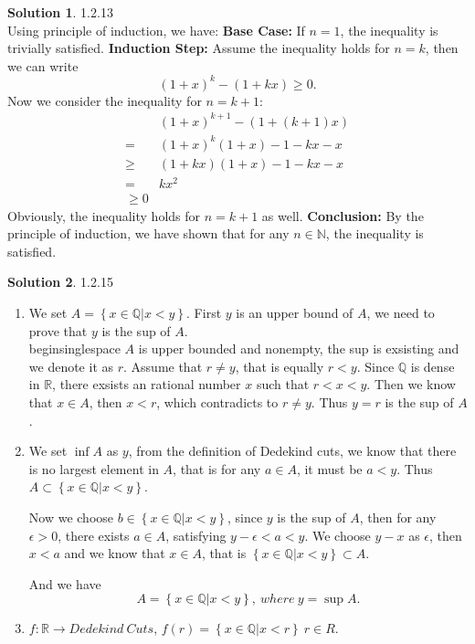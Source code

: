 \documentclass{article}
\theoremstyle{definition}
\newtheorem{sol}{Solution}[exe]
\begin{document}
\begin{sol} 1.2.13\\
Using principle of induction, we have:
\noindent\textbf{Base Case:} If $n=1$, the inequality is trivially satisfied.
\noindent\textbf{Induction Step:} Assume the inequality holds for $n=k$, then we can write
$$(1+x)^{k}-(1+kx)\geq 0.$$
Now we consider the inequality for $n=k+1$:
\begin{align*}
    &(1+x)^{k+1}-(1+(k+1)x)\\
    =&(1+x)^{k}(1+x)-1-kx-x\\
    \geq&(1+kx)(1+x)-1-kx-x\\
    =&kx^{2}\\
    \geq 0
\end{align*}
Obviously, the inequality holds for $n=k+1$ as well.
\noindent\textbf{Conclusion:} By the principle of induction, we have shown that for any $n\in \mathbb{N}$, the inequality is satisfied.

\end{sol}

\begin{sol} 1.2.15
\begin{enumerate}[label=(\alph*))]
\item  We set $A=\left\{x\in\mathbb{Q}|x<y\right\}$. First $y$ is an upper bound of $A$, we need to prove that $y$ is the sup of $A$. \\begin{singlespace}
    $A$ is upper bounded and nonempty, the sup is exsisting and we denote it as $r$. Assume that $r\neq y$, that is equally $r<y$. Since $\mathbb{Q}$ is dense in $\mathbb{R}$,
    there exsists an rational number $x$ such that $r<x<y$. Then we know that $x\in A$, then $x<r$, which contradicts to $r\neq y$. Thus $y=r$ is the sup of $A$.
\item We set $\inf A$ as $y$, from the definition of Dedekind cuts, we know that there is no largest element in $A$, that is for any $a\in A$, it must be $a<y$.
Thus $A\subset \left\{x\in\mathbb{Q}|x<y\right\}$.

Now we choose $b\in \left\{x\in\mathbb{Q}|x<y\right\}$, since $y$ is the sup of $A$, then for any $\epsilon>0$, there exists $a\in A$, satisfying $y-\epsilon<a<y$. We choose $y-x$ as $\epsilon$, then 
$x<a$ and we know that $x\in A$, that is $\left\{x\in\mathbb{Q}|x<y\right\}\subset A.$ 

And we have $$A=\left\{x\in\mathbb{Q}|x<y\right\},\ where\ y=\sup A.$$
\item $f:\mathbb{R}\rightarrow Dedekind\ Cuts$, $f(r)=\left\{x\in\mathbb{Q}|x<r\right\}\ r\in R.$
\end{enumerate}
\end{sol}
\end{document}
